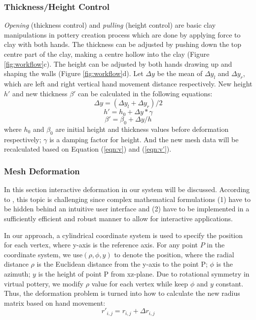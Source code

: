 \documentclass{svjour3}                     %
\begin{document}
\subsubsection{Thickness/Height Control}
\label{sec:4.2.2}
\textit{Opening} (thickness control) and \textit{pulling} (height control) are basic clay manipulations in pottery creation process which are done by applying force to clay with both hands. The thickness can be adjusted by pushing down the top centre part of the clay, making a centre hollow into the clay (Figure \ref{fig:workflow}c). The height can be adjusted by both hands drawing up and shaping the walls (Figure \ref{fig:workflow}d).
Let $\Delta y$ be the mean of $\Delta y_{l}$ and $\Delta y_{r}$, which are left and right vertical hand movement distance respectively. New height $h'$ and new thickness $\beta'$ can be calculated in the following equations:
\begin{equation}
\Delta y = (\Delta y_{l} + \Delta y_{r})/2
\end{equation}
\begin{equation}
h' = h_{0} + \Delta y * \gamma
\end{equation}
\begin{equation}
\beta' = \beta_{0} + \Delta y/ h
\end{equation}
where $h_{0}$ and $\beta_{0}$ are initial height and thickness values before deformation respectively; $\gamma$ is a damping factor for height. And the new mesh data will be recalculated based on Equation (\ref{eqn:v}) and (\ref{eqn:v'}).

\subsubsection{Mesh Deformation}
\label{sec:4.2.3}
In this section interactive deformation in our system will be discussed. According to \cite{botsch2010polygon}, this topic is challenging since complex mathematical formulations (1) have to be hidden behind an intuitive user interface and (2) have to be implemented in a sufficiently efficient and robust manner to allow for interactive applications.

In our approach, a cylindrical coordinate system is used to specify the position for each vertex, where y-axis is the reference axis. For any point $P$ in the coordinate system, we use$(\rho, \phi, y)$ to denote the position, where the radial distance $\rho$ is the Euclidean distance from the y-axis to the point P; $\phi$ is the azimuth; $y$ is the height of point P from xz-plane.
Due to rotational symmetry in virtual pottery, we modify $\rho$ value for each vertex while keep $\phi$ and $y$ constant. Thus, the deformation problem is turned into how to calculate the new radius matrix based on hand movement:
\begin{equation}
r'_{i,j} = r_{i,j} + \Delta r_{i,j}
\end{equation}
\end{document}
